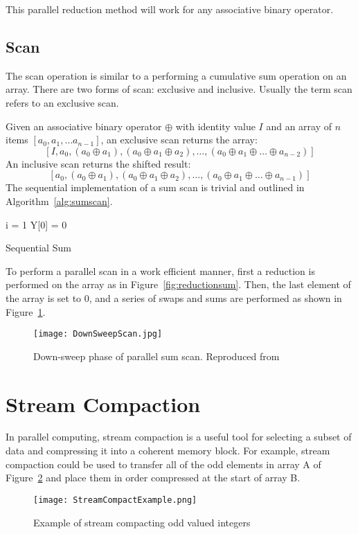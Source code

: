 This parallel reduction method will work for any associative binary operator.

\subsection{Scan}
The scan operation is similar to a performing a cumulative sum operation on an array. There are two forms of scan: exclusive and inclusive. Usually the term scan refers to an exclusive scan.\par
Given an associative binary operator $\oplus$ with identity value $I$ and an array of $n$ items $[a_0, a_1, \ldots a_{n-1}]$, an exclusive scan returns the array: $$[I, a_0, (a_0 \oplus a_1), (a_0 \oplus a_1 \oplus a_2),\ldots, (a_0 \oplus a_1 \oplus \ldots \oplus a_{n-2})]$$ An inclusive scan returns the shifted result:  $$[a_0, (a_0 \oplus a_1), (a_0 \oplus a_1 \oplus a_2),\ldots, (a_0 \oplus a_1 \oplus \ldots \oplus a_{n-1})]$$ The sequential implementation of a sum scan is trivial and outlined in Algorithm~\ref{alg:sumscan}.

\begin{algorithm}[H]
\label{alg:sumscan}
 \singlespacing
 i = 1\;
 Y[0] = 0\;
 \caption{Sequential Sum}
\end{algorithm}
To perform a parallel scan in a work efficient manner, first a reduction is performed on the array as in Figure~\ref{fig:reductionsum}. Then, the last element of the array is set to 0, and a series of swaps and sums are performed as shown in Figure~\ref{fig:downsweepscan}.
\begin{figure}[h]
    \centering
    \texttt{[image: DownSweepScan.jpg]}
    \caption{Down-sweep phase of parallel sum scan. Reproduced from\cite{nguyen2007gpu}}
    \label{fig:downsweepscan}
\end{figure}
\section{Stream Compaction}
In parallel computing, stream compaction is a useful tool for selecting a subset of data and compressing it into a coherent memory block. For example, stream compaction could be used to transfer all of the odd elements in array A of Figure~\ref{fig:streamcompactexample} and place them in order compressed at the start of array B.

\begin{figure}[h]
    \centering
    \texttt{[image: StreamCompactExample.png]}
    \caption{Example of stream compacting odd valued integers}
    \label{fig:streamcompactexample}
\end{figure}

